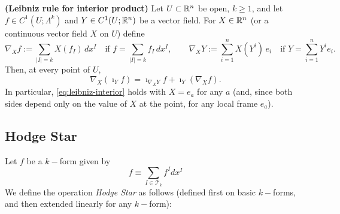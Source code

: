 \begin{proposition}\textbf{(Leibniz rule for interior product)}\label{prop:leibniz_rule_for_interior} Let $U\subset\mathbb{R}^n$ be open, $k\ge 1$, and let $f\in C^1(U;\Lambda^k)$ and
$Y\in C^1(U;\mathbb{R}^n)$ be a vector field. For $X\in\mathbb{R}^n$ (or a continuous vector field $X$ on $U$) define
\[
\nabla_X f:=\sum_{|I|=k}X(f_I)\,dx^I
\quad\text{if } f=\sum_{|I|=k} f_I\,dx^I,
\qquad
\nabla_X Y:=\sum_{i=1}^n X(Y^i)\,e_i
\quad\text{if } Y=\sum_{i=1}^n Y^i e_i .
\]
Then, at every point of $U$,
\begin{equation}\label{eq:leibniz-interior}
\nabla_X(\imath_Y f)=\imath_{\nabla_X Y}f+\imath_Y(\nabla_X f).
\end{equation}
In particular, \eqref{eq:leibniz-interior} holds with $X=e_a$ for any
$a$ (and, since both sides depend only on the value of $X$ at the point, for any local frame $e_a$).    
\end{proposition}

\subsection{Hodge Star}
Let $f$ be a $k-$form given by $$f\equiv \sum_{I\in \mathscr T_k} f^I dx^I $$
We define the operation \emph{Hodge Star} as follows (defined first on basic $k-$forms, and then extended linearly for any $k-$form): 

